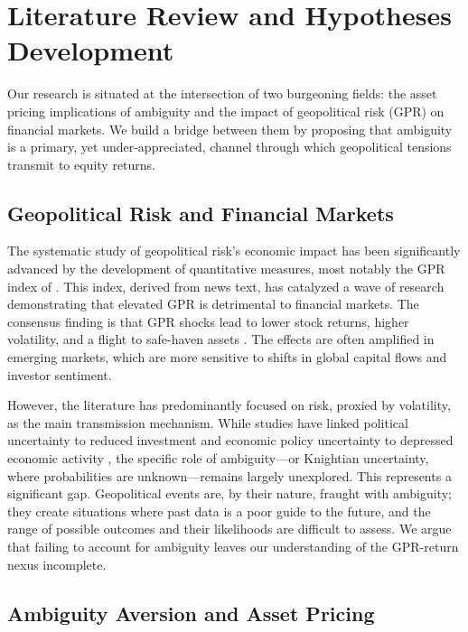 \documentclass[preprint,12pt,authoryear]{elsarticle}
\begin{document}
\section{Literature Review and Hypotheses Development}
\label{sec:literature}

Our research is situated at the intersection of two burgeoning fields: the asset pricing implications of ambiguity and the impact of geopolitical risk (GPR) on financial markets. We build a bridge between them by proposing that ambiguity is a primary, yet under-appreciated, channel through which geopolitical tensions transmit to equity returns.

\subsection{Geopolitical Risk and Financial Markets}

The systematic study of geopolitical risk's economic impact has been significantly advanced by the development of quantitative measures, most notably the GPR index of \citet{Caldara2022}. This index, derived from news text, has catalyzed a wave of research demonstrating that elevated GPR is detrimental to financial markets. The consensus finding is that GPR shocks lead to lower stock returns, higher volatility, and a flight to safe-haven assets \citep{Caldara2022}. The effects are often amplified in emerging markets, which are more sensitive to shifts in global capital flows and investor sentiment.

However, the literature has predominantly focused on risk, proxied by volatility, as the main transmission mechanism. While studies have linked political uncertainty to reduced investment \citep{Pastor2013} and economic policy uncertainty to depressed economic activity \citep{Baker2016}, the specific role of ambiguity—or Knightian uncertainty, where probabilities are unknown—remains largely unexplored. This represents a significant gap. Geopolitical events are, by their nature, fraught with ambiguity; they create situations where past data is a poor guide to the future, and the range of possible outcomes and their likelihoods are difficult to assess. We argue that failing to account for ambiguity leaves our understanding of the GPR-return nexus incomplete.

\subsection{Ambiguity Aversion and Asset Pricing}
\end{document}
